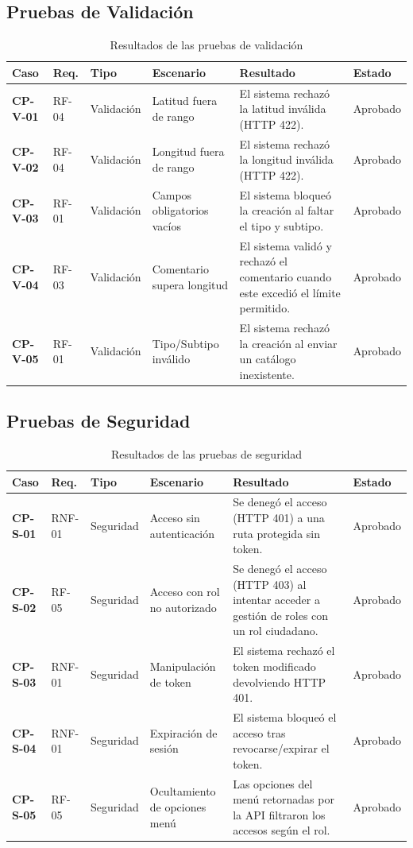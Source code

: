 \subsection{Pruebas de Validación}
\begin{xltabular}{\textwidth}{X X X X X X}
    \caption{Resultados de las pruebas de validación}
    \label{tab:pruebas_validacion} \\
    \toprule
    \textbf{Caso} & \textbf{Req.} & \textbf{Tipo} & \textbf{Escenario} & \textbf{Resultado} & \textbf{Estado} \\
    \midrule
    \textbf{CP-V-01} & RF-04 & Validación & Latitud fuera de rango & El sistema rechazó la latitud inválida (HTTP 422). & Aprobado \\
    \textbf{CP-V-02} & RF-04 & Validación & Longitud fuera de rango & El sistema rechazó la longitud inválida (HTTP 422). & Aprobado \\
    \textbf{CP-V-03} & RF-01 & Validación & Campos obligatorios vacíos & El sistema bloqueó la creación al faltar el tipo y subtipo. & Aprobado \\
    \textbf{CP-V-04} & RF-03 & Validación & Comentario supera longitud & El sistema validó y rechazó el comentario cuando este excedió el límite permitido. & Aprobado \\
    \textbf{CP-V-05} & RF-01 & Validación & Tipo/Subtipo inválido & El sistema rechazó la creación al enviar un catálogo inexistente. & Aprobado \\
    \bottomrule
\end{xltabular}

\subsection{Pruebas de Seguridad}
\begin{xltabular}{\textwidth}{X X X X X X}
    \caption{Resultados de las pruebas de seguridad}
    \label{tab:pruebas_seguridad} \\
    \toprule
    \textbf{Caso} & \textbf{Req.} & \textbf{Tipo} & \textbf{Escenario} & \textbf{Resultado} & \textbf{Estado} \\
    \midrule
    \textbf{CP-S-01} & RNF-01 & Seguridad & Acceso sin autenticación & Se denegó el acceso (HTTP 401) a una ruta protegida sin token. & Aprobado \\
    \textbf{CP-S-02} & RF-05 & Seguridad & Acceso con rol no autorizado & Se denegó el acceso (HTTP 403) al intentar acceder a gestión de roles con un rol ciudadano. & Aprobado \\
    \textbf{CP-S-03} & RNF-01 & Seguridad & Manipulación de token & El sistema rechazó el token modificado devolviendo HTTP 401. & Aprobado \\
    \textbf{CP-S-04} & RNF-01 & Seguridad & Expiración de sesión & El sistema bloqueó el acceso tras revocarse/expirar el token. & Aprobado \\
    \textbf{CP-S-05} & RF-05 & Seguridad & Ocultamiento de opciones menú & Las opciones del menú retornadas por la API filtraron los accesos según el rol. & Aprobado \\
    \bottomrule
\end{xltabular}
